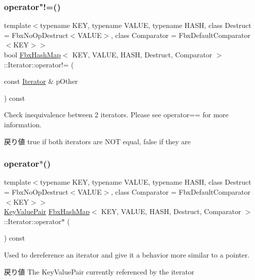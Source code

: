\subsubsection{\texorpdfstring{operator"!=()}{operator!=()}}
{\footnotesize\ttfamily template$<$typename K\+EY, typename V\+A\+L\+UE, typename H\+A\+SH, class Destruct = Fbx\+No\+Op\+Destruct$<$\+V\+A\+L\+U\+E$>$, class Comparator = Fbx\+Default\+Comparator$<$\+K\+E\+Y$>$$>$ \\
bool \hyperlink{class_fbx_hash_map}{Fbx\+Hash\+Map}$<$ K\+EY, V\+A\+L\+UE, H\+A\+SH, Destruct, Comparator $>$\+::Iterator\+::operator!= (\begin{DoxyParamCaption}\item[{const \hyperlink{class_fbx_hash_map_1_1_iterator}{Iterator} \&}]{p\+Other }\end{DoxyParamCaption}) const}

Check inequivalence between 2 iterators. Please see operator== for more information. \begin{DoxyReturn}{戻り値}
true if both iterators are N\+OT equal, false if they are 
\end{DoxyReturn}
\mbox{\label{class_fbx_hash_map_1_1_iterator_a0ab28ebe60b4c300d3ebf092d80b3ab3}} 
\subsubsection{\texorpdfstring{operator$\ast$()}{operator*()}}
{\footnotesize\ttfamily template$<$typename K\+EY, typename V\+A\+L\+UE, typename H\+A\+SH, class Destruct = Fbx\+No\+Op\+Destruct$<$\+V\+A\+L\+U\+E$>$, class Comparator = Fbx\+Default\+Comparator$<$\+K\+E\+Y$>$$>$ \\
\hyperlink{class_fbx_hash_map_1_1_iterator_a2a68388bbedcb2e86a927259561fc1d4}{Key\+Value\+Pair} \hyperlink{class_fbx_hash_map}{Fbx\+Hash\+Map}$<$ K\+EY, V\+A\+L\+UE, H\+A\+SH, Destruct, Comparator $>$\+::Iterator\+::operator$\ast$ (\begin{DoxyParamCaption}{ }\end{DoxyParamCaption}) const}

Used to dereference an iterator and give it a behavior more similar to a pointer. \begin{DoxyReturn}{戻り値}
The Key\+Value\+Pair currently referenced by the iterator 
\end{DoxyReturn}
\mbox{\label{class_fbx_hash_map_1_1_iterator_a2bacfdaa8a84d7f5bf41447bc35ccc31}} 
